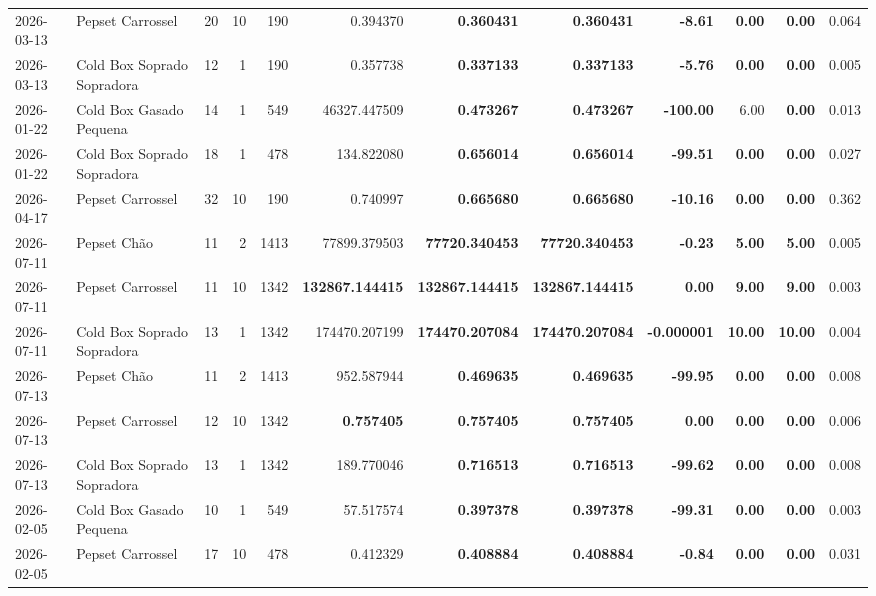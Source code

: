 {\begin{center}
{\begin{tabular}{@{}llrrrrrrrrrr@{}}
2026-03-13 & Pepset Carrossel & 20 & 10 & 190 & 0.394370 & \textbf{0.360431} & \textbf{0.360431} & \textbf{-8.61} & \textbf{0.00} & \textbf{0.00} & 0.064 \\
2026-03-13 & Cold Box Soprado Sopradora & 12 & 1 & 190 & 0.357738 & \textbf{0.337133} & \textbf{0.337133} & \textbf{-5.76} & \textbf{0.00} & \textbf{0.00} & 0.005 \\
2026-01-22 & Cold Box Gasado Pequena & 14 & 1 & 549 & 46327.447509 & \textbf{0.473267} & \textbf{0.473267} & \textbf{-100.00} & 6.00 & \textbf{0.00} & 0.013 \\
2026-01-22 & Cold Box Soprado Sopradora & 18 & 1 & 478 & 134.822080 & \textbf{0.656014} & \textbf{0.656014} & \textbf{-99.51} & \textbf{0.00} & \textbf{0.00} & 0.027 \\
2026-04-17 & Pepset Carrossel & 32 & 10 & 190 & 0.740997 & \textbf{0.665680} & \textbf{0.665680} & \textbf{-10.16} & \textbf{0.00} & \textbf{0.00} & 0.362 \\
2026-07-11 & Pepset Chão & 11 & 2 & 1413 & 77899.379503 & \textbf{77720.340453} & \textbf{77720.340453} & \textbf{-0.23} & \textbf{5.00} & \textbf{5.00} & 0.005 \\
2026-07-11 & Pepset Carrossel & 11 & 10 & 1342 & \textbf{132867.144415} & \textbf{132867.144415} & \textbf{132867.144415} & \textbf{0.00} & \textbf{9.00} & \textbf{9.00} & 0.003 \\
2026-07-11 & Cold Box Soprado Sopradora & 13 & 1 & 1342 & 174470.207199 & \textbf{174470.207084} & \textbf{174470.207084} & \textbf{-0.000001} & \textbf{10.00} & \textbf{10.00} & 0.004 \\
2026-07-13 & Pepset Chão & 11 & 2 & 1413 & 952.587944 & \textbf{0.469635} & \textbf{0.469635} & \textbf{-99.95} & \textbf{0.00} & \textbf{0.00} & 0.008 \\
2026-07-13 & Pepset Carrossel & 12 & 10 & 1342 & \textbf{0.757405} & \textbf{0.757405} & \textbf{0.757405} & \textbf{0.00} & \textbf{0.00} & \textbf{0.00} & 0.006 \\
2026-07-13 & Cold Box Soprado Sopradora & 13 & 1 & 1342 & 189.770046 & \textbf{0.716513} & \textbf{0.716513} & \textbf{-99.62} & \textbf{0.00} & \textbf{0.00} & 0.008 \\
2026-02-05 & Cold Box Gasado Pequena & 10 & 1 & 549 & 57.517574 & \textbf{0.397378} & \textbf{0.397378} & \textbf{-99.31} & \textbf{0.00} & \textbf{0.00} & 0.003 \\
2026-02-05 & Pepset Carrossel & 17 & 10 & 478 & 0.412329 & \textbf{0.408884} & \textbf{0.408884} & \textbf{-0.84} & \textbf{0.00} & \textbf{0.00} & 0.031 \\
\bottomrule
\end{tabular}%
}
\end{center}
}
